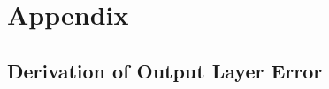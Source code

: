 \documentclass[pageno]{jpaper}
\begin{document}



\section{Appendix}
\label{Appendix}

\subsection{Derivation of Output Layer Error}
\label{Derivation of Output Layer Error}

\end{document}
